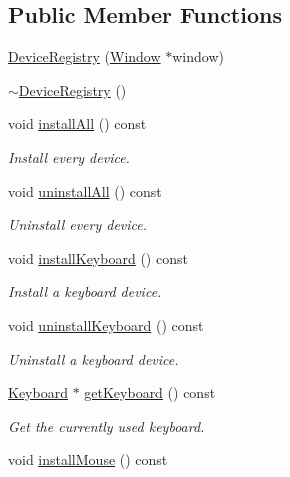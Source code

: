 \subsection*{Public Member Functions}
\begin{DoxyCompactItemize}
\item 
\mbox{\hyperlink{classec_1_1_device_registry_adbe0912caca04d8c401f58b57dc11524}{Device\+Registry}} (\mbox{\hyperlink{classec_1_1_window}{Window}} $\ast$window)
\item 
\mbox{\hyperlink{classec_1_1_device_registry_a75dff0df1527fe9d7e75b25f3dff4028}{$\sim$\+Device\+Registry}} ()
\item 
void \mbox{\hyperlink{classec_1_1_device_registry_a344190c579b44d1238538edb06acd7d7}{install\+All}} () const
\begin{DoxyCompactList}\small\item\em Install every device. \end{DoxyCompactList}\item 
void \mbox{\hyperlink{classec_1_1_device_registry_ab5dc2383c4d5c6f8458f8be914dc7982}{uninstall\+All}} () const
\begin{DoxyCompactList}\small\item\em Uninstall every device. \end{DoxyCompactList}\item 
void \mbox{\hyperlink{classec_1_1_device_registry_aae6852074dd4602f225b1358a2d3d814}{install\+Keyboard}} () const
\begin{DoxyCompactList}\small\item\em Install a keyboard device. \end{DoxyCompactList}\item 
void \mbox{\hyperlink{classec_1_1_device_registry_a1ff6b28edf3073f0a483a04bd0b3458d}{uninstall\+Keyboard}} () const
\begin{DoxyCompactList}\small\item\em Uninstall a keyboard device. \end{DoxyCompactList}\item 
\mbox{\hyperlink{classec_1_1_keyboard}{Keyboard}} $\ast$ \mbox{\hyperlink{classec_1_1_device_registry_aabbeda3bb4977e230b974c92b6048027}{get\+Keyboard}} () const
\begin{DoxyCompactList}\small\item\em Get the currently used keyboard. \end{DoxyCompactList}\item 
void \mbox{\hyperlink{classec_1_1_device_registry_a8ec9d722e1798e6fd8fddc954f4b2cf0}{install\+Mouse}} () const

\end{DoxyCompactItemize}
